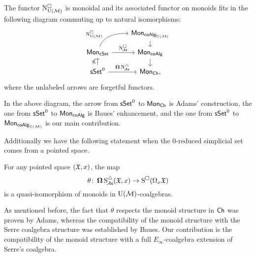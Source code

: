 \begin{theorem*}
	The functor $\operatorname{N^{\square}_{{\operatorname{U}(\mathcal{M})}}}$ is monoidal and its associated functor on monoids fits in the following diagram commuting up to natural isomorphisms:
	\[
	\begin{tikzcd} [row sep=small]
		& \Mon_{\coAlg_\UM} \arrow[d] \\
		\Mon_{\cSet} \arrow[ru, "\cchainsUM", out=70, in=180, near start] \arrow[r, "\cchainsA"]
		& \Mon_{\coAlg} \arrow[d] \\
		\sSet^0 \arrow[r, "\cobar \schainsA"] \arrow[u, "\ccobar"]
		& \Mon_{\Ch},
	\end{tikzcd}
	\]
	where the unlabeled arrows are forgetful functors.
\end{theorem*}

In the above diagram, the arrow from $\mathsf{sSet}^0$ to $\mathsf{Mon}_{\mathsf{Ch}}$ is Adams' construction, the one from $\mathsf{sSet}^0$ to $\mathsf{Mon}_{\mathsf{coAlg}}$ is Baues' enhancement, and the one from $\mathsf{sSet}^0$ to $\mathsf{Mon}_{\mathsf{coAlg}_{{\operatorname{U}(\mathcal{M})}}}$ is our main contribution.

Additionally we have the following statement when the 0-reduced simplicial set comes from a pointed space.

\begin{theorem*}
	For any pointed space $(\mathfrak{X}, x)$, the map
	\[
	\theta \colon \operatorname{\mathbf{\Omega}} \operatorname{S^{\triangle}_{\!{\mathcal{A}\mathsf{s}}}}(\mathfrak{X}, x) \to \operatorname{S^{\square}}(\Omega_x \mathfrak{X})
	\]
	is a quasi-isomorphism of monoids in ${\operatorname{U}(\mathcal{M})}$-coalgebras.
\end{theorem*}

As mentioned before, the fact that $\theta$ respects the monoid structure in $\mathsf{Ch}$ was proven by Adams, whereas the compatibility of the monoid structure with the Serre coalgebra structure was established by Baues.
Our contribution is the compatibility of the monoid structure with a full $E_\infty$-coalgebra extension of Serre's coalgebra.
